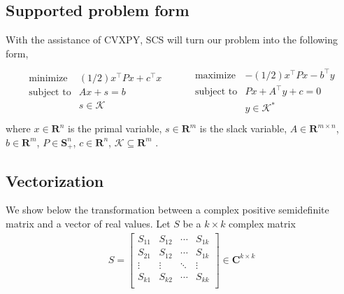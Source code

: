 \subsection{Supported problem form}
With the assistance of CVXPY, SCS will turn our problem into the following form,
\begin{align}
    \begin{split}\begin{array}{lcr}
            \begin{array}{ll}
                \mbox{minimize}   & (1/2)x^\top  P x + c^\top  x \\
                \mbox{subject to} & Ax + s = b                   \\
                                  & s \in \mathcal{K}
            \end{array}
             & \quad &
            \begin{array}{ll}
                \mbox{maximize}   & -(1/2)x^\top  P x - b^\top  y \\
                \mbox{subject to} & Px + A^\top y + c = 0         \\
                                  & y \in \mathcal{K}^*
            \end{array}
        \end{array}
    \end{split}
\end{align}
where $x \in \mathbf{R}^{n}$ is the primal variable,
$s \in \mathbf{R}^{m}$ is the slack variable,
$A \in \mathbf{R}^{m \times n}$,
$b \in \mathbf{R}^{m}$,
$P \in \mathbf{S}^{n}_{+}$,
$c \in \mathbf{R}^{n}$,
$\mathcal{K} \subseteq \mathbf{R}^{m}$
.

\subsection{Vectorization}
We show below the transformation between a complex positive semidefinite matrix and a vector of real values.
Let $S$ be a $k \times k$ complex matrix
\begin{align}
    S = \begin{bmatrix}
            S_{11} & S_{12} & \cdots & S_{1k} \\
            S_{21} & S_{12} & \cdots & S_{1k} \\
            \vdots & \vdots & \ddots & \vdots \\
            S_{k1} & S_{k2} & \cdots & S_{kk} \\
        \end{bmatrix}
    \in \mathbf{C}^{k \times k}
\end{align}

